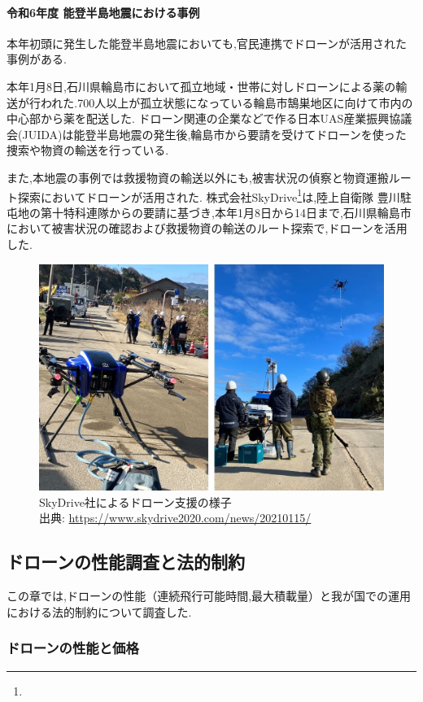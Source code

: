 \documentclass{article}[jsarticle]
\begin{document}
\paragraph{令和6年度 能登半島地震における事例}
本年初頭に発生した能登半島地震においても,官民連携でドローンが活用された事例がある.\par 
本年1月8日,石川県輪島市において孤立地域・世帯に対しドローンによる薬の輸送が行われた.700人以上が孤立状態になっている輪島市鵠巣地区に向けて市内の中心部から薬を配送した.
ドローン関連の企業などで作る日本UAS産業振興協議会(JUIDA)は能登半島地震の発生後,輪島市から要請を受けてドローンを使った捜索や物資の輸送を行っている.\par 
また,本地震の事例では救援物資の輸送以外にも,被害状況の偵察と物資運搬ルート探索においてドローンが活用された.
株式会社SkyDrive\footnote{}は,陸上自衛隊 豊川駐屯地の第十特科連隊からの要請に基づき,本年1月8日から14日まで,石川県輪島市において被害状況の確認および救援物資の輸送のルート探索で,ドローンを活用した.
\begin{figure}[H]
    \centering
    \includegraphics[scale=0.2]{./Images/202401311838.jpg}
    \captionsetup{justification=centering}
    \caption{
        SkyDrive社によるドローン支援の様子 \\
        出典: \url{https://www.skydrive2020.com/news/20210115/}
    }
\end{figure}

\subsection{ドローンの性能調査と法的制約}
この章では,ドローンの性能（連続飛行可能時間,最大積載量）と我が国での運用における法的制約について調査した.
\subsubsection{ドローンの性能と価格}
\end{document}
